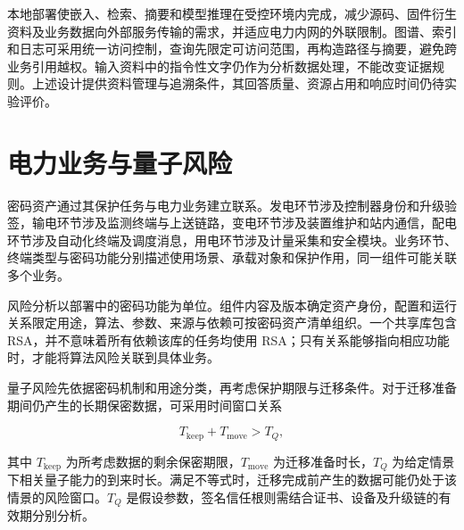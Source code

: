 本地部署使嵌入、检索、摘要和模型推理在受控环境内完成，减少源码、固件衍生资料及业务数据向外部服务传输的需求，并适应电力内网的外联限制。图谱、索引和日志可采用统一访问控制，查询先限定可访问范围，再构造路径与摘要，避免跨业务引用越权。输入资料中的指令性文字仍作为分析数据处理，不能改变证据规则。上述设计提供资料管理与追溯条件，其回答质量、资源占用和响应时间仍待实验评价。


\section{电力业务与量子风险}
\label{sec:power-risk-principles}

密码资产通过其保护任务与电力业务建立联系。发电环节涉及控制器身份和升级验签，输电环节涉及监测终端与上送链路，变电环节涉及装置维护和站内通信，配电环节涉及自动化终端及调度消息，用电环节涉及计量采集和安全模块。业务环节、终端类型与密码功能分别描述使用场景、承载对象和保护作用，同一组件可能关联多个业务。

风险分析以部署中的密码功能为单位。组件内容及版本确定资产身份，配置和运行关系限定用途，算法、参数、来源与依赖可按密码资产清单组织\cite{cbom16}。一个共享库包含 RSA，并不意味着所有依赖该库的任务均使用 RSA；只有关系能够指向相应功能时，才能将算法风险关联到具体业务。

量子风险先依据密码机制和用途分类，再考虑保护期限与迁移条件。对于迁移准备期间仍产生的长期保密数据，可采用时间窗口关系

\begin{equation}
  T_{\mathrm{keep}}+T_{\mathrm{move}}>T_Q,
  \label{eq:power-migration-window}
\end{equation}

其中 $T_{\mathrm{keep}}$ 为所考虑数据的剩余保密期限，$T_{\mathrm{move}}$ 为迁移准备时长，$T_Q$ 为给定情景下相关量子能力的到来时长\cite{mosca2018}。满足不等式时，迁移完成前产生的数据可能仍处于该情景的风险窗口。$T_Q$ 是假设参数，签名信任根则需结合证书、设备及升级链的有效期分别分析。

